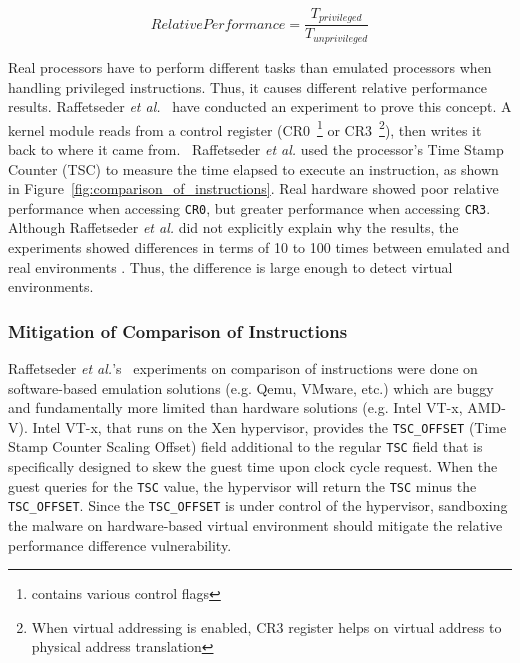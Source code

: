 \begin{equation*}
Relative Performance = \frac{T_{privileged}}{T_{unprivileged}}
\end{equation*}

Real processors have to perform different tasks than emulated processors when
handling privileged instructions. Thus, it causes different relative performance
results. Raffetseder {\em et al.}~\cite{raffetseder2007} have conducted an
experiment to prove this concept. A kernel module reads from a control register
(CR0~\footnote{contains various control flags} or CR3~\footnote{When virtual
  addressing is enabled, CR3 register helps on virtual address to physical
  address translation}), then writes it back to where it came
from.~ Raffetseder {\em et al.} used the
processor's Time Stamp Counter (TSC) to measure the time elapsed to execute an
instruction, as shown in Figure~\ref{fig:comparison_of_instructions}. Real
hardware showed poor relative performance when accessing {\tt CR0}, but greater
performance when accessing {\tt CR3}. Although Raffetseder {\em et al.} did not
explicitly explain why the results, the experiments showed differences in terms
of 10 to 100 times between emulated and real environments . Thus, the difference is large enough to detect virtual
environments.

\subsubsection{Mitigation of Comparison of Instructions}
\label{sssec:mitigation_relative}

Raffetseder {\em et al.}'s~\cite{raffetseder2007} experiments on comparison of
instructions were done on software-based emulation solutions (e.g. Qemu, VMware,
etc.) which are buggy and fundamentally more limited than hardware solutions
(e.g. Intel VT-x, AMD-V). Intel VT-x, that runs on the Xen hypervisor, provides
the \texttt{TSC\_OFFSET} (Time Stamp Counter Scaling Offset) field additional to
the regular \texttt{TSC} field that is specifically designed to skew the guest
time upon clock cycle request. When the guest queries for the \texttt{TSC}
value, the hypervisor will return the \texttt{TSC} minus the
\texttt{TSC\_OFFSET}. Since the \texttt{TSC\_OFFSET} is under control of the
hypervisor, sandboxing the malware on hardware-based virtual environment should
mitigate the relative performance difference vulnerability.

